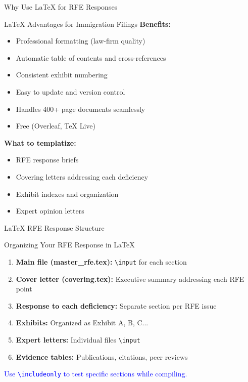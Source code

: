 \documentclass[11pt]{beamer}
\begin{document}
	
	\begin{frame}{Why Use LaTeX for RFE Responses}
		\scriptsize
		\begin{block}{LaTeX Advantages for Immigration Filings}
			\textbf{Benefits:}
			\begin{itemize}
				\item Professional formatting (law-firm quality)
				\item Automatic table of contents and cross-references
				\item Consistent exhibit numbering
				\item Easy to update and version control
				\item Handles 400+ page documents seamlessly
				\item Free (Overleaf, TeX Live)
			\end{itemize}
			\textbf{What to templatize:}
			\begin{itemize}
				\item RFE response briefs
				\item Covering letters addressing each deficiency
				\item Exhibit indexes and organization
				\item Expert opinion letters
			\end{itemize}
		\end{block}
	\end{frame}
	
	\begin{frame}{LaTeX RFE Response Structure}
		\scriptsize
		\begin{block}{Organizing Your RFE Response in LaTeX}
			\begin{enumerate}
				\item \textbf{Main file (master\_rfe.tex):} \texttt{\textbackslash input} for each section
				\item \textbf{Cover letter (covering.tex):} Executive summary addressing each RFE point
				\item \textbf{Response to each deficiency:} Separate section per RFE issue
				\item \textbf{Exhibits:} Organized as Exhibit A, B, C...
				\item \textbf{Expert letters:} Individual files \texttt{\textbackslash input}
				\item \textbf{Evidence tables:} Publications, citations, peer reviews
			\end{enumerate}
			\textcolor{blue}{Use \texttt{\textbackslash includeonly} to test specific sections while compiling.}
		\end{block}
	\end{frame}
	
\end{document}
